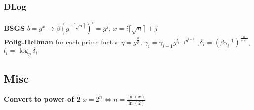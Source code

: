 \documentclass[twoside, 11pt]{article}
\begin{document}
            \subsubsection*{DLog}
                \textbf{BSGS} $b = g^{x} \rightarrow \beta(g^{-\lceil \sqrt{n}\rceil})^{i} = g^{j}$, $x = i\lceil \sqrt{n} \rceil + j$ \\
                \textbf{Polig-Hellman} for each prime factor $\eta = g^{\frac{n}{p}}$, $\gamma_{i}=\gamma_{i-1}g^{l_{i-1}p^{i-1}}$ ,$\delta_{i}=(\beta\gamma_{i}^{-1})^{\frac{n}{p^{i+1}}}$, $l_{i}=\log_{\eta}\delta_{i}$

        \subsection*{Misc}
            \textbf{Convert to power of 2} $x = 2^{n} \Leftrightarrow n = \frac{\ln(x)}{\ln(2)}$ \\
\end{document}
